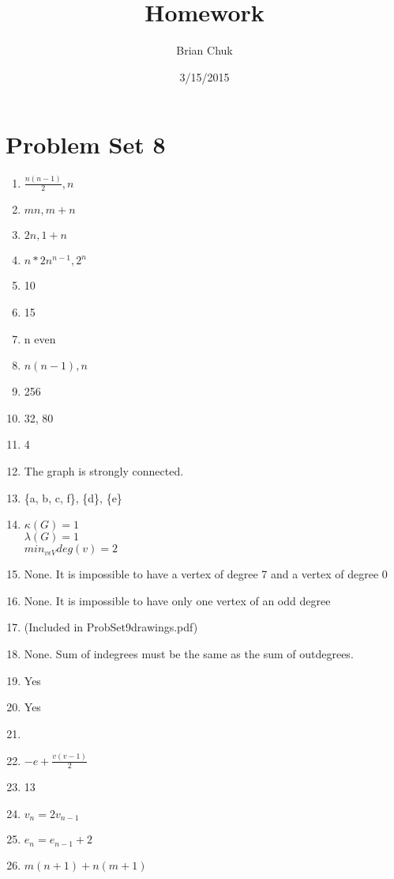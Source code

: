 \documentclass[11pt]{article}
\title{\textbf{Homework}}
\author{Brian Chuk}
\date{3/15/2015}
\begin{document}
\maketitle

\section{Problem Set 8}
\begin{enumerate}
\item $\frac{n(n-1)}{2}, n$
\item $mn, m +n$
\item $2n, 1 + n$
\item $n * 2n^{n - 1}, 2^n$
\item 10
\item 15
\item n even
\item $n(n-1), n$
\item 256
\item 32, 80
\item 4
\\
\setcounter{enumi}{18}
\item The graph is strongly connected.
\item \{a, b, c, f\}, \{d\}, \{e\}
\item $\kappa(G)=1$
	\\$\lambda(G)=1$
	\\$min_{v{\epsilon}V}deg(v)=2$
\item None. It is impossible to have a vertex of degree 7 and a vertex of degree 0
\item None. It is impossible to have only one vertex of an odd degree
\item (Included in ProbSet9drawings.pdf)
\item None. Sum of indegrees must be the same as the sum of outdegrees.
\\
\setcounter{enumi}{27}
\item Yes
\item Yes
\item 
\item $-e + \frac{v(v-1)}{2}$
\item 13

\setcounter{enumi}{35}
\item $v_n = 2v_{n-1}$
\item $e_n = e_{n-1} + 2$
\item $ m(n + 1) + n(m + 1)$
\end{enumerate}
\end{document}

